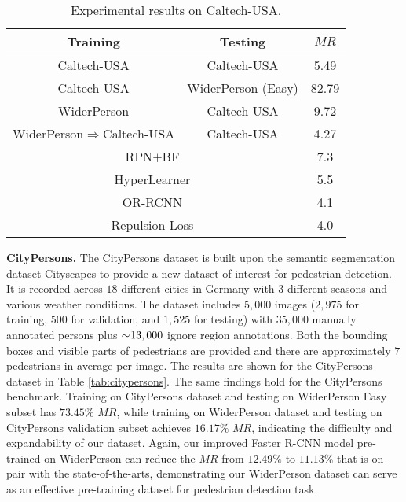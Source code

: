 \documentclass[journal]{IEEEtran}
\begin{document}
\begin{table}[t]
\begin{center}
\caption{Experimental results on Caltech-USA.}
\label{tab:caltech-usa}
\setlength{\tabcolsep}{13pt}
\begin{tabular}{ccc}
\toprule[2pt]
{Training} & {Testing} & $MR$ \\
\hline
Caltech-USA & Caltech-USA & {5.49}\\
Caltech-USA & WiderPerson (Easy) & {82.79}\\
WiderPerson & Caltech-USA & {9.72}\\
WiderPerson$\Rightarrow$Caltech-USA & Caltech-USA & {4.27}\\
\hline
\hline
\multicolumn{2}{c}{RPN$+$BF~\cite{DBLP:conf/eccv/ZhangLLH16}} &7.3\\
\multicolumn{2}{c}{HyperLearner~\cite{DBLP:conf/cvpr/MaoXJC17}} &5.5\\
\multicolumn{2}{c}{OR-RCNN~\cite{zhang2018occlusion}} &4.1\\
\multicolumn{2}{c}{Repulsion Loss~\cite{DBLP:journals/corr/abs-1711-07752}} &4.0\\
\bottomrule[2pt]
\end{tabular}
\end{center}
\end{table}

{\flushleft \textbf{CityPersons. }}
The CityPersons dataset is built upon the semantic segmentation dataset Cityscapes to provide a new dataset of interest for pedestrian detection. It is recorded across $18$ different cities in Germany with $3$ different seasons and various weather conditions. The dataset includes $5,000$ images ($2,975$ for training, $500$ for validation, and $1,525$ for testing) with $35,000$ manually annotated persons plus $\sim\negmedspace 13,000$ ignore region annotations. Both the bounding boxes and visible parts of pedestrians are provided and there are approximately $7$ pedestrians in average per image. The results are shown for the CityPersons dataset in Table \ref{tab:citypersons}. The same findings hold for the CityPersons benchmark. Training on CityPersons dataset and testing on WiderPerson Easy subset has $73.45\%$ $MR$, while training on WiderPerson dataset and testing on CityPersons validation subset achieves $16.17\%$ $MR$, indicating the difficulty and expandability of our dataset. Again, our improved Faster R-CNN model pre-trained on WiderPerson can reduce the $MR$ from $12.49\%$ to $11.13\%$ that is on-pair with the state-of-the-arts, demonstrating our WiderPerson dataset can serve as an effective pre-training dataset for pedestrian detection task.
\end{document}
